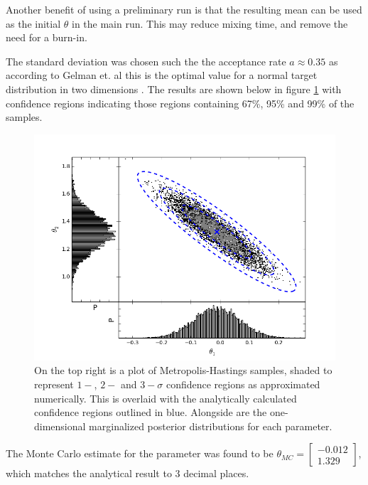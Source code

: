 \documentclass[a4paper,11pt,twoside]{article}
\begin{document}
Another benefit of using a preliminary run is that the resulting mean can be used
as the initial $\theta$ in the main run. This may reduce mixing time, and
remove the need for a burn-in\cite{handbook}.

The standard deviation was chosen such the the acceptance rate $a \approx 0.35$
as according to Gelman et. al this is the optimal value for a
normal target distribution in two dimensions \cite{acceptance}.
The results are shown below in figure \ref{fig:marginalized} with confidence regions indicating those
regions containing 67\%, 95\% and 99\% of the samples.



\begin{figure}[!ht]
	\centering
	\includegraphics[width=\textwidth]{marginalized.png}
	\caption{On the top right is a plot of Metropolis-Hastings samples, shaded to
	represent $1-$, $2-$ and $3-\sigma$ confidence regions as approximated
	numerically. This is overlaid with the analytically calculated confidence
	regions outlined in blue. Alongside are the one-dimensional marginalized posterior
	distributions for each parameter.}
	\label{fig:marginalized}
\end{figure}
The Monte Carlo estimate for the parameter was found to be $\theta_{MC} = \begin{bmatrix} 
		-0.012 \\
	1.329 \end{bmatrix}$, which matches the analytical result to 3 decimal places.
\end{document}
